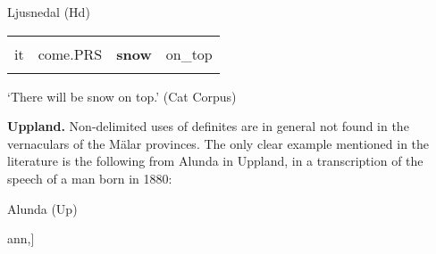 
\begin{listWWNumileveli}
\item {}

\begin{styleExample}
Ljusnedal (Hd)

\end{styleExample}

\end{listWWNumileveli}

\begin{tabular}{llll}
\lsptoprule
\multicolumn{4}{l}{Dä

}\\
it & come.PRS & {\bfseries snow} & on\_top\\
\lspbottomrule
\end{tabular}

\begin{styleTranslation}
‘There will be snow on top.’ (Cat Corpus)

\end{styleTranslation}

\begin{styleBodytextC}
\textbf{Uppland. }Non-delimited uses of definites are in general not found in the vernaculars of the Mälar provinces. The only clear example mentioned in the literature is the following from Alunda in Uppland, in a transcription of the speech of a man born in 1880:

\end{styleBodytextC}

\begin{listWWNumileveli}
\item {}

\begin{styleExample}
\label{bkm:Ref154222780}Alunda (Up)

\end{styleExample}

\end{listWWNumileveli}

\begin{styleExText}
[Ann(â)rs sô brênde-råm åpp rörn ib[29F?]ann,] 

\end{styleExText}

